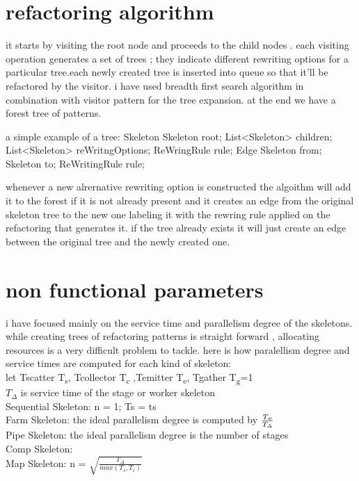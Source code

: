 \documentclass[12pt]{report}
\begin{document}
\section{refactoring algorithm}
it starts by visiting the root node and proceeds to the child nodes . each visiting operation generates a set of trees ; they indicate different rewriting options for a particular tree.each newly created tree is inserted into queue so that it'll be refactored by the visitor. i have used breadth first search algorithm in combination with visitor pattern for the tree expansion. at the end we have a forest tree of patterns.

a simple example of a tree:
	Skeleton {
		Skeleton root;
		List<Skeleton> children;
		List<Skeleton> reWritngOptions;
		ReWringRule rule;
	}
	Edge{
		Skeleton from;
		Skeleton to;
		ReWritingRule rule;
	}
	
whenever a new alrernative rewriting option is constructed the algoithm will add it to the forest if it is not already present and it creates an edge from the original skeleton tree to the new one labeling it with the rewring rule applied on the refactoring that generates it. if the tree already exists it will just create an edge between the original tree and the newly created one. 

\section{non functional parameters}
i have focused mainly on the service time and parallelism degree of the skeletons. 
while creating trees of refactoring patterns is straight forward , allocating resources is a very difficult problem to tackle. here is how  paralellism degree and service times are computed for each kind of skeleton:\\
	let \ttfamily Tscatter 	T\textsubscript{s}, 					Tcollector T\textsubscript{c} ,Temitter T\textsubscript{e}, Tgather T\textsubscript{g}=1\\
	$T_{\Delta}$ is service time of the stage or worker skeleton\\
	Sequential Skeleton:	n = 1; Ts = ts\\
	Farm Skeleton:	the ideal parallelism degree is computed by $\frac{T\textsubscript{e}}{T_{\Delta}}$\\
	Pipe Skeleton: the ideal parallelism degree is the number of stages\\
	Comp Skeleton:\\
     Map Skeleton:  n = $\sqrt{\frac{T_{\Delta}}{max(T_s, T_c)}}$
\end{document}
